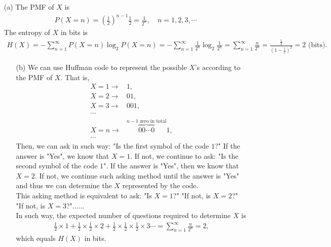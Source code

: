 \documentclass{assignment}
\begin{document}
\begin{sol}
    \begin{itemize}
        \item[(a)] The PMF of $X$ is
        \begin{align}
            P(X=n)=\left(\frac{1}{2}\right)^{n-1}\frac{1}{2}=\frac{1}{2^n},\quad n=1,2,3,\cdots
        \end{align}
        The entropy of $X$ in bits is
        \begin{align}
            H(X)=-\sum_{n=1}^{\infty}P(X=n)\log_2P(X=n)=-\sum_{n=1}^{\infty}\frac{1}{2^n}\log_2\frac{1}{2^n}=\sum_{n=1}^{\infty}\frac{n}{2^n}=\frac{\frac{1}{2}}{\left(1-\frac{1}{2}\right)^2}=2\text{ (bits)}.
        \end{align}
        \begin{itemize}
            \item[(b)] We can use Huffman code to represent the possible $X$'s according to the PMF of $X$. That is,
            \begin{align*}
                X=1\rightarrow&1,\\
                X=2\rightarrow&01,\\
                X=3\rightarrow&001,\\
                \cdots&\\
                X=n\rightarrow&\overbrace{00\cdots 0}^{n-1\text{ zero in total}}1,\\
                \cdots&
            \end{align*}
            Then, we can ask in such way: "Is the first symbol of the code $1$?" If the answer is "Yes", we know that $X=1$. If not, we continue to ask: "Is the second symbol of the code $1$". If the answer is "Yes", then we know that $X=2$. If not, we continue such asking method until the answer is "Yes" and thus we can determine the $X$ represented by the code.\\
            This asking method is equivalent to ask: "Is $X=1$?" "If not, is $X=2$?" "If not, is $X=3$?"......\\
            In such way, the expected number of questions required to determine $X$ is
            \begin{align}
                \frac{1}{2}\times 1+\frac{1}{2}\times\frac{1}{2}\times 2+\frac{1}{2}\times\frac{1}{2}\times\frac{1}{2}\times 3\cdots=\sum_{n=1}^{\infty}\frac{n}{2^n}=2,
            \end{align}
            which equals $H(X)$ in bits.
        \end{itemize}
    \end{itemize}
\end{sol}
\end{document}
